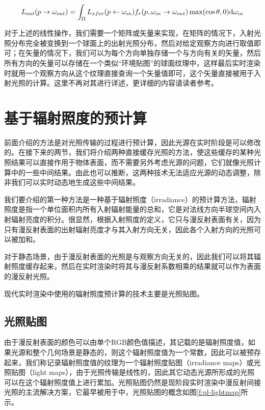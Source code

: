 \begin{equation}
	L_{out}(p\to\omega_{out})=\int_{\Omega}L_{xfer}(p\leftarrow\omega_{in})f_r(p,\omega_{in}\to\omega_{out})\max(\cos \theta,0){\rm d}\omega_{in}
\end{equation}

对于上述的线性操作，我们需要一个矩阵或矢量来实现，在矩阵的情况下，入射光照分布完全被变换到一个球面上的出射光照分布，然后对给定观察方向进行取值即可；在矢量的情况下，我们可以为每个方向单独存储一个与方向有关的矢量，然后所有方向的矢量可以存储在一个类似“环境贴图”的球面纹理中，这样最后实时渲染时就用一个观察方向从这个纹理直接查询一个矢量值即可，这个矢量直接被用于入射光照的计算。这里不再对其进行详述，更详细的内容请读者参考\cite{a:PrecomputedRadianceTransfer:TheoryandPractice}。




\section{基于辐射照度的预计算}\label{sec:pl-irradiance-caching}
前面介绍的方法是对光照传输的过程进行预计算，因此光源在实时阶段是可以修改的。在接下来的两节，我们将介绍两种直接缓存光照的方法，使这些缓存的某种光照结果可以直接作用于物体表面，而不需要另外考虑光源的问题，它们就像光照计算中的一些中间结果。由此也可以推断，这两种技术无法适应光源的动态调整，除非我们可以实时动态地生成这些中间结果。

我们要介绍的第一种方法是一种基于辐射照度（irradiance）的预计算方法，辐射照度是指一个单位面积内所有入射辐射能量的总和，它是对法线方向半球空间内入射辐射亮度的积分。很显然，根据入射照度的定义，它只与漫反射表面有关，因为只有漫反射表面的出射辐射亮度才与其入射方向无关，因此各个入射方向的光照可以被加和。

对于静态场景，由于漫反射表面的光照是与观察方向无关的，因此我们可以将其辐射照度缓存起来，然后在实时渲染时将其与漫反射系数相乘的结果就可以作为表面的漫反射光照。

现代实时渲染中使用的辐射照度预计算的技术主要是光照贴图。



\subsection{光照贴图}
由于漫反射表面的颜色可以由单个RGB颜色值描述，其记载的是辐射照度值，如果光源和整个几何场景是静态的，则这个辐射照度值为一个常数，因此可以被预存起来，我们称记录辐射照度值的纹理为一个辐射照度贴图（irradiance maps）或光照贴图（light maps），由于光照传输是线性的，因此其它动态光源所形成的光照可以在这个辐射照度值上进行累加。光照贴图仍然是现阶段实时渲染中漫反射间接光照的主流解决方案\cite{m:LightmappingQuickstart,m:LightmassGlobalIllumination,a:PrecomputedLightinginCallofDuty}，它最早被用于\cite{a:QuakesLightingModel:SurfaceCaching}中，光照贴图的概念如图\ref{f:pl-lightmap}所示。

